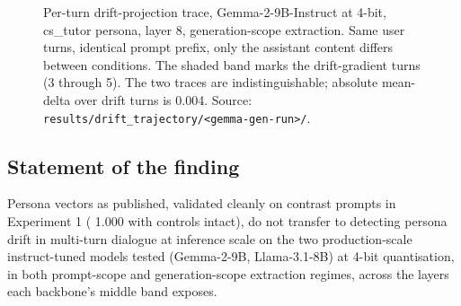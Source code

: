 \begin{figure}[H]
  \centering
  \caption{Per-turn drift-projection trace, Gemma-2-9B-Instruct at 4-bit, cs\_tutor persona, layer 8, generation-scope extraction. Same user turns, identical prompt prefix, only the assistant content differs between conditions. The shaded band marks the drift-gradient turns (3 through 5). The two traces are indistinguishable; absolute mean-delta over drift turns is 0.004. Source: \texttt{results/drift\_trajectory/<gemma-gen-run>/}.}
  \label{fig:drift-trajectory-cell}
\end{figure}

\subsection{Statement of the finding}
\label{sec:experiment-2-finding}

Persona vectors as published\autocite{chen2025personavectors}, validated cleanly on contrast prompts in Experiment 1 (\auroc{} 1.000 with controls intact), do not transfer to detecting persona drift in multi-turn dialogue at inference scale on the two production-scale instruct-tuned models tested (Gemma-2-9B, Llama-3.1-8B) at 4-bit quantisation, in both prompt-scope and generation-scope extraction regimes, across the layers each backbone's middle band exposes.


